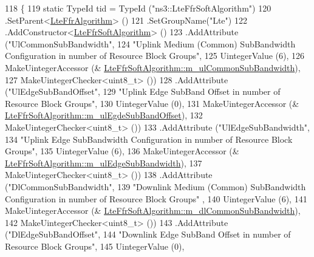 \begin{DoxyCode}
118 \{
119   \textcolor{keyword}{static} TypeId tid = TypeId (\textcolor{stringliteral}{"ns3::LteFfrSoftAlgorithm"})
120     .SetParent<\hyperlink{classns3_1_1LteFfrAlgorithm_a1cfb2b0c9339553d90bf3eee7b66b25f}{LteFfrAlgorithm}> ()
121     .SetGroupName(\textcolor{stringliteral}{"Lte"})
122     .AddConstructor<\hyperlink{classns3_1_1LteFfrSoftAlgorithm_a0a5a0ec557890339cae51572157ad6f8}{LteFfrSoftAlgorithm}> ()
123     .AddAttribute (\textcolor{stringliteral}{"UlCommonSubBandwidth"},
124                    \textcolor{stringliteral}{"Uplink Medium (Common) SubBandwidth Configuration in number of Resource Block Groups"},
125                    UintegerValue (6),
126                    MakeUintegerAccessor (&
      \hyperlink{classns3_1_1LteFfrSoftAlgorithm_aa396d091845aaef619bec9b68b27ad30}{LteFfrSoftAlgorithm::m\_ulCommonSubBandwidth}),
127                    MakeUintegerChecker<uint8\_t> ())
128     .AddAttribute (\textcolor{stringliteral}{"UlEdgeSubBandOffset"},
129                    \textcolor{stringliteral}{"Uplink Edge SubBand Offset in number of Resource Block Groups"},
130                    UintegerValue (0),
131                    MakeUintegerAccessor (&
      \hyperlink{classns3_1_1LteFfrSoftAlgorithm_a2070e526e28547d0a048ed13d75a91f1}{LteFfrSoftAlgorithm::m\_ulEgdeSubBandOffset}),
132                    MakeUintegerChecker<uint8\_t> ())
133     .AddAttribute (\textcolor{stringliteral}{"UlEdgeSubBandwidth"},
134                    \textcolor{stringliteral}{"Uplink Edge SubBandwidth Configuration in number of Resource Block Groups"},
135                    UintegerValue (6),
136                    MakeUintegerAccessor (&
      \hyperlink{classns3_1_1LteFfrSoftAlgorithm_a234348307fd58d2686342a7114899216}{LteFfrSoftAlgorithm::m\_ulEdgeSubBandwidth}),
137                    MakeUintegerChecker<uint8\_t> ())
138     .AddAttribute (\textcolor{stringliteral}{"DlCommonSubBandwidth"},
139                    \textcolor{stringliteral}{"Downlink Medium (Common) SubBandwidth Configuration in number of Resource Block Groups"}
      ,
140                    UintegerValue (6),
141                    MakeUintegerAccessor (&
      \hyperlink{classns3_1_1LteFfrSoftAlgorithm_acf36db070125788cad30dd1e9792889a}{LteFfrSoftAlgorithm::m\_dlCommonSubBandwidth}),
142                    MakeUintegerChecker<uint8\_t> ())
143     .AddAttribute (\textcolor{stringliteral}{"DlEdgeSubBandOffset"},
144                    \textcolor{stringliteral}{"Downlink Edge SubBand Offset in number of Resource Block Groups"},
145                    UintegerValue (0),

\end{DoxyCode}
